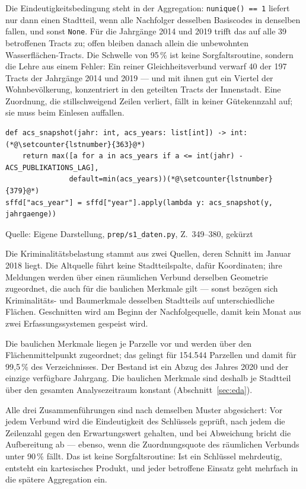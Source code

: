\documentclass[12pt,a4paper]{article}
\newcommand{\tabquelle}[1][Eigene Darstellung]{%
  \par\setlength{\parskip}{0pt}\vspace{3pt}%
  {\setstretch{1}\fontsize{9pt}{11pt}\selectfont\raggedright Quelle: #1\par}%
}
\begin{document}
Die Eindeutigkeitsbedingung steht in der Aggregation: \texttt{nunique() == 1}
liefert nur dann einen Stadtteil, wenn alle Nachfolger desselben Basiscodes in
denselben fallen, und sonst \texttt{None}. Für die Jahrgänge 2014 und 2019
trifft das auf alle 39 betroffenen Tracts zu; offen bleiben danach allein die
unbewohnten Wasserflächen-Tracts. Die Schwelle von 95\,\% ist keine
Sorgfaltsroutine, sondern die Lehre aus einem Fehler: Ein reiner
Gleichheitsverbund verwarf 40 der 197 Tracts der Jahrgänge 2014 und 2019 --- und
mit ihnen gut ein Viertel der Wohnbevölkerung, konzentriert in den geteilten
Tracts der Innenstadt. Eine Zuordnung, die stillschweigend Zeilen verliert,
fällt in keiner Gütekennzahl auf; sie muss beim Einlesen auffallen.
 
\begin{quellcode}[htbp]
\caption{Zeitbewusste Zuordnung des ACS-Jahrgangs}
\label{lst:acs-versatz}\vspace{-3.5pt}
\begin{lstlisting}[style=pythonstil,firstnumber=349]
def acs_snapshot(jahr: int, acs_years: list[int]) -> int:(*@\setcounter{lstnumber}{363}@*)
    return max([a for a in acs_years if a <= int(jahr) - ACS_PUBLIKATIONS_LAG],
               default=min(acs_years))(*@\setcounter{lstnumber}{379}@*)
sffd["acs_year"] = sffd["year"].apply(lambda y: acs_snapshot(y, jahrgaenge))
\end{lstlisting}
\tabquelle[Eigene Darstellung, \texttt{prep/s1\_daten.py}, Z.~349--380, gekürzt]
\end{quellcode}
 
Die Kriminalitätsbelastung stammt aus zwei Quellen, deren Schnitt im Januar
2018 liegt. Die Altquelle führt keine Stadtteilspalte, dafür Koordinaten; ihre
Meldungen werden über einen räumlichen Verbund derselben Geometrie zugeordnet,
die auch für die baulichen Merkmale gilt --- sonst bezögen sich Kriminalitäts-
und Baumerkmale desselben Stadtteils auf unterschiedliche Flächen.
Geschnitten wird am Beginn der
Nachfolgequelle, damit kein Monat aus zwei Erfassungssystemen gespeist wird.
 
Die baulichen Merkmale liegen je Parzelle vor und werden über den
Flächenmittelpunkt zugeordnet; das gelingt für 154.544 Parzellen und damit für
99,5\,\% des Verzeichnisses. Der Bestand ist ein Abzug des Jahres 2020 und der
einzige verfügbare Jahrgang. Die baulichen Merkmale sind deshalb je Stadtteil
über den gesamten Analysezeitraum konstant (Abschnitt~\ref{sec:eda}).
 
Alle drei Zusammenführungen sind nach demselben Muster abgesichert: Vor jedem
Verbund wird die Eindeutigkeit des Schlüssels geprüft, nach jedem die Zeilenzahl
gegen den Erwartungswert gehalten, und bei Abweichung bricht die Aufbereitung
ab --- ebenso, wenn die Zuordnungsquote des
räumlichen Verbunds unter 90\,\% fällt. Das ist keine Sorgfaltsroutine: Ist ein
Schlüssel mehrdeutig, entsteht ein kartesisches Produkt, und jeder betroffene
Einsatz geht mehrfach in die spätere Aggregation ein.
\end{document}
